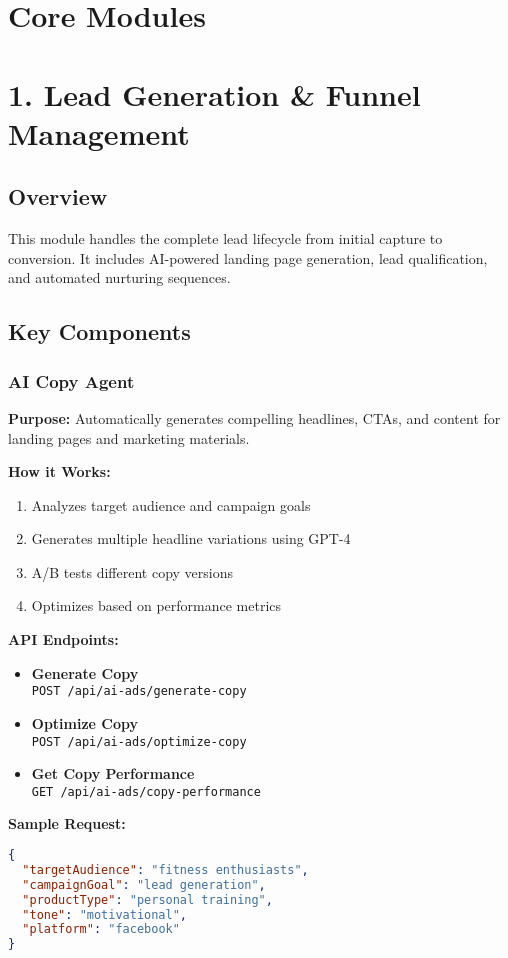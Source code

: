 \documentclass[12pt,a4paper]{article}
\newcommand{\apiendpoint}[2]{\textbf{#1} \\ \texttt{#2}}
\newcommand{\samplecode}[1]{\begin{lstlisting}[language=JSON]#1\end{lstlisting}}
\begin{document}
\section{Core Modules}

\section{1. Lead Generation \& Funnel Management}

\subsection{Overview}
This module handles the complete lead lifecycle from initial capture to conversion. It includes AI-powered landing page generation, lead qualification, and automated nurturing sequences.

\subsection{Key Components}

\subsubsection{AI Copy Agent}
\textbf{Purpose:} Automatically generates compelling headlines, CTAs, and content for landing pages and marketing materials.

\textbf{How it Works:}
\begin{enumerate}
    \item Analyzes target audience and campaign goals
    \item Generates multiple headline variations using GPT-4
    \item A/B tests different copy versions
    \item Optimizes based on performance metrics
\end{enumerate}

\textbf{API Endpoints:}
\begin{itemize}
    \item \apiendpoint{Generate Copy}{POST /api/ai-ads/generate-copy}
    \item \apiendpoint{Optimize Copy}{POST /api/ai-ads/optimize-copy}
    \item \apiendpoint{Get Copy Performance}{GET /api/ai-ads/copy-performance}
\end{itemize}

\textbf{Sample Request:}
\samplecode{
{
  "targetAudience": "fitness enthusiasts",
  "campaignGoal": "lead generation",
  "productType": "personal training",
  "tone": "motivational",
  "platform": "facebook"
}
}
\end{document}
